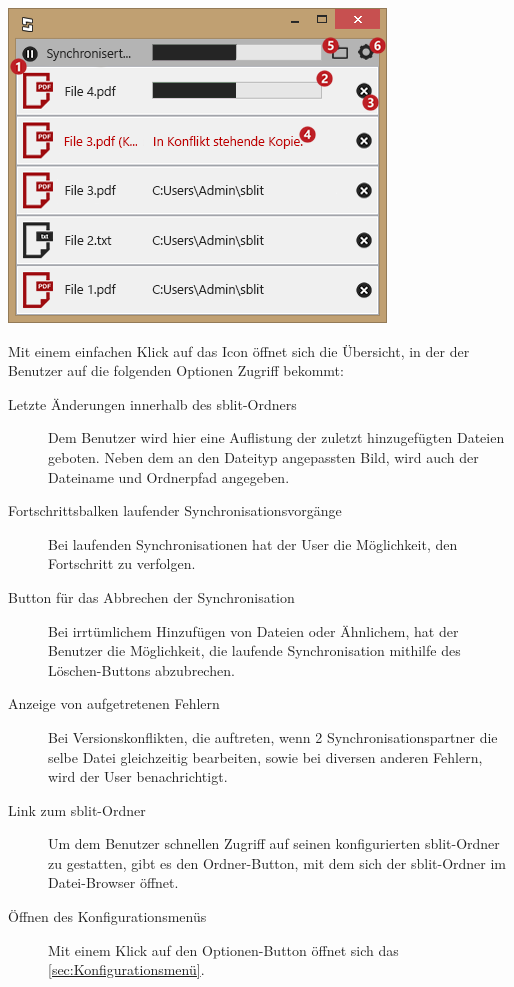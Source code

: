 \includegraphics[]{images/systemtray.png}

Mit einem einfachen Klick auf das Icon öffnet sich die Übersicht, in der der
Benutzer auf die folgenden Optionen Zugriff bekommt:

\begin{description}

	\item[{Letzte Änderungen innerhalb des sblit-Ordners}]
		Dem Benutzer wird hier eine Auflistung der zuletzt hinzugefügten Dateien
		geboten. Neben dem an den Dateityp angepassten Bild, wird auch der Dateiname
		und Ordnerpfad angegeben.

	\item[{Fortschrittsbalken laufender Synchronisationsvorgänge}]
		Bei laufenden Synchronisationen hat der User die Möglichkeit, den
		Fortschritt zu verfolgen.

	\item[{Button für das Abbrechen der Synchronisation}]
		Bei irrtümlichem Hinzufügen von Dateien oder Ähnlichem, hat der Benutzer die
		 Möglichkeit, die laufende Synchronisation mithilfe des Löschen-Buttons
		abzubrechen.

	\item[{Anzeige von aufgetretenen Fehlern}]
		Bei Versionskonflikten, die auftreten, wenn 2 Synchronisationspartner die
		selbe Datei gleichzeitig bearbeiten, sowie bei diversen anderen Fehlern,
		wird der User benachrichtigt.

	\item[{Link zum sblit-Ordner}]
		Um dem Benutzer schnellen Zugriff auf seinen konfigurierten sblit-Ordner zu
		gestatten, gibt es den Ordner-Button, mit dem sich der sblit-Ordner im
		Datei-Browser öffnet.

	\item[{Öffnen des Konfigurationsmenüs}]
		Mit einem Klick auf den Optionen-Button öffnet sich das
		\ref{sec:Konfigurationsmenü}.
\end{description}
